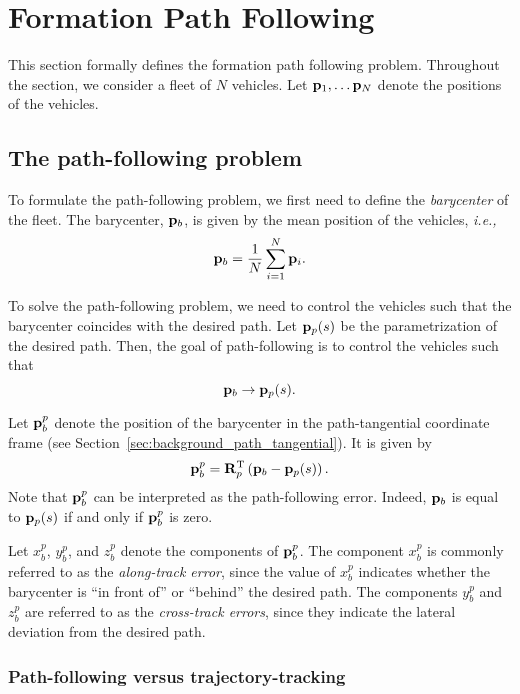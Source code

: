 \section{Formation Path Following}

This section formally defines the formation path following problem.
Throughout the section, we consider a fleet of $N$ vehicles.
Let $\mathbf{p}_1, \ldots \mathbf{p}_N$ denote the positions of the vehicles.

\subsection{The path-following problem}
To formulate the path-following problem, we first need to define the \emph{barycenter} of the fleet.
The barycenter, $\mathbf{p}_b$, is given by the mean position of the vehicles, \emph{i.e.,}
\begin{equation}
    \mathbf{p}_b = \frac{1}{N} \sum_{i=1}^N \mathbf{p}_i.
\end{equation}

To solve the path-following problem, we need to control the vehicles such that the barycenter coincides with the desired path.
Let $\mathbf{p}_p(s)$ be the parametrization of the desired path.
Then, the goal of path-following is to control the vehicles such that
\begin{equation}
    \mathbf{p}_b \rightarrow \mathbf{p}_p(s).
\end{equation}

Let $\mathbf{p}_b^p$ denote the position of the barycenter in the path-tangential coordinate frame (see Section~\ref{sec:background_path_tangential}).
It is given by
\begin{equation}
    \mathbf{p}_b^p = \mathbf{R}_p^{\mathrm{T}} \left(\mathbf{p}_b - \mathbf{p}_p(s)\right).
\end{equation}
Note that $\mathbf{p}_b^p$ can be interpreted as the path-following error.
Indeed, $\mathbf{p}_b$ is equal to $\mathbf{p}_p(s)$ if and only if $\mathbf{p}_b^p$ is zero.

Let $x_b^p$, $y_b^p$, and $z_b^p$ denote the components of $\mathbf{p}_b^p$.
The component $x_b^p$ is commonly referred to as the \emph{along-track error}, since the value of $x_b^p$ indicates whether the barycenter is ``in front of'' or ``behind'' the desired path.
The components $y_b^p$ and $z_b^p$ are referred to as the \emph{cross-track errors}, since they indicate the lateral deviation from the desired path.

\subsubsection{Path-following versus trajectory-tracking}

